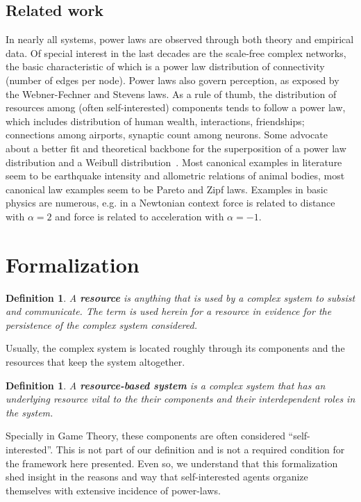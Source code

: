 \documentclass[a4paper, 11pt]{article} %
\newtheorem{definition2}[theorem3]{Definition}
\begin{document}
\subsection{Related work}
In nearly all systems, power laws are observed through both theory and empirical data.
Of special interest in the last decades are the scale-free complex networks,
the basic characteristic of which is a power law distribution of connectivity (number of edges per node).
Power laws also govern perception, as exposed by the Webner-Fechner and Stevens laws.
As a rule of thumb, the distribution of resources among (often self-interested) components
tends to follow a power law,
which includes distribution of human wealth, interactions, friendships;
connections among airports, synaptic count among neurons.
Some advocate 
about a better fit and theoretical backbone for the superposition of a
 power law distribution and a Weibull distribution~\cite{powWeib}.
 Most canonical examples in literature seem to be earthquake intensity and allometric relations of animal bodies,
 most canonical law examples seem to be Pareto and Zipf laws.
 Examples in basic physics are numerous, e.g. in a Newtonian context force is related to distance with $\alpha=2$ and force is related to acceleration with $\alpha=-1$.~\cite{part,pbook}

\section{Formalization}\label{sec:form}

\begin{definition2}
	A {\bf resource} is anything that is used by a complex system to subsist and communicate. The term is used herein for a resource in evidence for the persistence of the complex system considered.
\end{definition2}

 Usually, the complex system is located roughly through its components and the resources that keep the system altogether.

\begin{definition2}
	A {\bf resource-based system} is a complex system that has an underlying resource vital to the their components and their interdependent roles in the system.
\end{definition2}

Specially in Game Theory, these components are often considered
``self-interested''. This is not part of our definition and
is not a required condition for the framework here presented.
Even so, we understand that this formalization shed insight
in the reasons and way that self-interested agents
organize themselves
with extensive incidence of power-laws.
\end{document}
